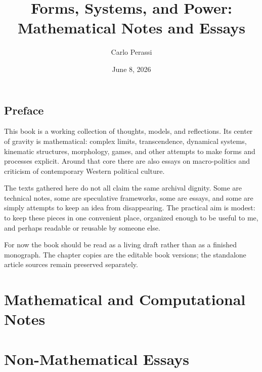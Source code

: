 \documentclass[11pt,twoside,openright]{book}
\title{Forms, Systems, and Power:\\Mathematical Notes and Essays}
\author{Carlo Perassi}
\date{June 8, 2026}
\theoremstyle{plain}
\theoremstyle{definition}
\theoremstyle{remark}
\begin{document}
\frontmatter
\maketitle
\chapter*{Preface}

This book is a working collection of thoughts, models, and reflections. Its
center of gravity is mathematical: complex limits, transcendence, dynamical
systems, kinematic structures, morphology, games, and other attempts to make
forms and processes explicit. Around that core there are also essays on
macro-politics and criticism of contemporary Western political culture.

The texts gathered here do not all claim the same archival dignity. Some are
technical notes, some are speculative frameworks, some are essays, and some are
simply attempts to keep an idea from disappearing. The practical aim is modest:
to keep these pieces in one convenient place, organized enough to be useful to
me, and perhaps readable or reusable by someone else.

For now the book should be read as a living draft rather than as a finished
monograph. The chapter copies are the editable book versions; the standalone
article sources remain preserved separately.

\tableofcontents

\mainmatter

\part{Mathematical and Computational Notes}










\part{Non-Mathematical Essays}






\end{document}
